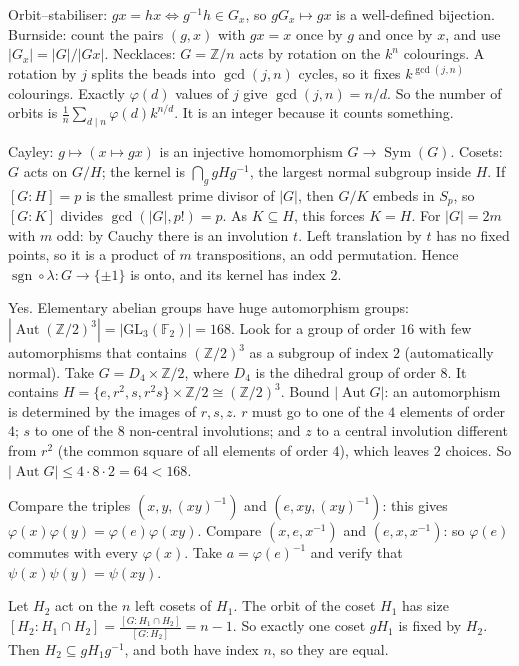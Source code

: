 \documentclass[11pt,a4paper]{article}
\begin{document}

 Orbit--stabiliser: $gx=hx\iff g^{-1}h\in G_x$, so $gG_x\mapsto gx$ is a well-defined bijection. Burnside: count the pairs $(g,x)$ with $gx=x$ once by $g$ and once by $x$, and use $|G_x|=|G|/|Gx|$.
 Necklaces: $G=\mathbb Z/n$ acts by rotation on the $k^n$ colourings. A rotation by $j$ splits the beads into $\gcd(j,n)$ cycles, so it fixes $k^{\gcd(j,n)}$ colourings. Exactly $\varphi(d)$ values of $j$ give $\gcd(j,n)=n/d$.
 So the number of orbits is $\frac1n\sum_{d\mid n}\varphi(d)k^{n/d}$. It is an integer because it counts something.

 Cayley: $g\mapsto(x\mapsto gx)$ is an injective homomorphism $G\to\operatorname{Sym}(G)$. Cosets: $G$ acts on $G/H$; the kernel is $\bigcap_g gHg^{-1}$, the largest normal subgroup inside $H$.
 If $[G:H]=p$ is the smallest prime divisor of $|G|$, then $G/K$ embeds in $S_p$, so $[G:K]$ divides $\gcd(|G|,p!)=p$. As $K\subseteq H$, this forces $K=H$.
 For $|G|=2m$ with $m$ odd: by Cauchy there is an involution $t$. Left translation by $t$ has no fixed points, so it is a product of $m$ transpositions, an odd permutation. Hence $\operatorname{sgn}\circ\lambda:G\to\{\pm1\}$ is onto, and its kernel has index $2$.

 Yes. Elementary abelian groups have huge automorphism groups: $|\operatorname{Aut}(\mathbb Z/2)^3|=|\mathrm{GL}_3(\mathbb F_2)|=168$. Look for a group of order $16$ with few automorphisms that contains $(\mathbb Z/2)^3$ as a subgroup of index $2$ (automatically normal).
 Take $G=D_4\times\mathbb Z/2$, where $D_4$ is the dihedral group of order $8$. It contains $H=\{e,r^2,s,r^2s\}\times\mathbb Z/2\cong(\mathbb Z/2)^3$. Bound $|\operatorname{Aut}G|$: an automorphism is determined by the images of $r,s,z$. $r$ must go to one of the $4$ elements of order $4$; $s$ to one of the $8$ non-central involutions; and $z$ to a central involution different from $r^2$ (the common square of all elements of order $4$), which leaves $2$ choices. So $|\operatorname{Aut}G|\le4\cdot8\cdot2=64<168$.

 Compare the triples $(x,y,(xy)^{-1})$ and $(e,xy,(xy)^{-1})$: this gives $\varphi(x)\varphi(y)=\varphi(e)\varphi(xy)$.
 Compare $(x,e,x^{-1})$ and $(e,x,x^{-1})$: so $\varphi(e)$ commutes with every $\varphi(x)$. Take $a=\varphi(e)^{-1}$ and verify that $\psi(x)\psi(y)=\psi(xy)$.

 Let $H_2$ act on the $n$ left cosets of $H_1$. The orbit of the coset $H_1$ has size $[H_2:H_1\cap H_2]=\frac{[G:H_1\cap H_2]}{[G:H_2]}=n-1$.
 So exactly one coset $gH_1$ is fixed by $H_2$. Then $H_2\subseteq gH_1g^{-1}$, and both have index $n$, so they are equal.
\end{document}
